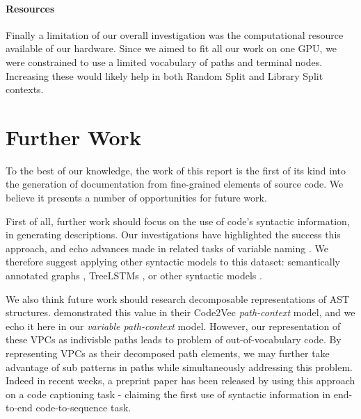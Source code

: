 \paragraph{Resources} 

Finally a limitation of our overall investigation was the computational resource available of our hardware. Since we aimed to fit all our work on one GPU, we were constrained to use a limited vocabulary of paths and terminal nodes. Increasing these would likely help in both Random Split and Library Split contexts.

\section{Further Work}

To the best of our knowledge, the work of this report is the first of its kind into the generation of documentation from fine-grained elements of source code.
We believe it presents a number of opportunities for future work.


First of all, further work should focus on the use of code's syntactic information, in generating descriptions. 
Our investigations have highlighted the success this approach, and echo advances made in related tasks of variable naming \citep{allamanis_learning_2017,alon_code2vec_2018}. 
We therefore suggest applying other syntactic models to this dataset: semantically annotated graphs \citep{allamanis_learning_2017}, TreeLSTMs \citep{tai_improved_2015}, or other syntactic models \citep{yin_syntactic_2017}. 

We also think future work should research decomposable representations of AST structures. \citet{alon_code2vec_2018} demonstrated this value in their Code2Vec \textit{path-context} model, and we echo it here in our \textit{variable path-context} model. However, our representation of these VPCs as indivisble paths leads to problem of out-of-vocabulary code. By representing VPCs as their decomposed path elements, we may further take advantage of sub patterns in paths while simultaneously addressing this problem. 
Indeed in recent weeks, a preprint paper has been released by \citep{alon_code2seq_2018} using this approach on a code captioning task - claiming the first use of syntactic information in end-to-end code-to-sequence task.

